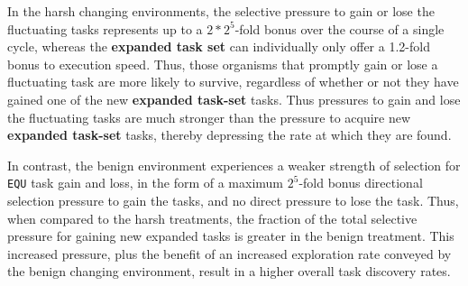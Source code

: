 \documentclass[10pt,letterpaper,final]{article}
\begin{document}
In the harsh changing environments, the selective pressure to gain or lose the fluctuating tasks represents up to a $2 * 2^5$-fold bonus over the course of a single cycle, whereas the \textbf{expanded task set} can individually only offer a 1.2-fold bonus to execution speed. Thus, those organisms that promptly gain or lose a fluctuating task are more likely to survive, regardless of whether or not they have gained one of the new \textbf{expanded task-set} tasks. Thus pressures to gain and lose the fluctuating tasks are much stronger than the pressure to acquire new \textbf{expanded task-set} tasks, thereby depressing the rate at which they are found.


In contrast, the benign environment experiences a weaker strength of selection for \texttt{EQU} task gain and loss, in the form of a maximum $2^5$-fold bonus directional selection pressure to gain the tasks, and no direct pressure to lose the task. Thus, when compared to the harsh treatments, the fraction of the total selective pressure for gaining new expanded tasks is greater in the benign treatment. This increased pressure, plus the benefit of an increased exploration rate conveyed by the benign changing environment, result in a higher overall task discovery rates.
\end{document}
